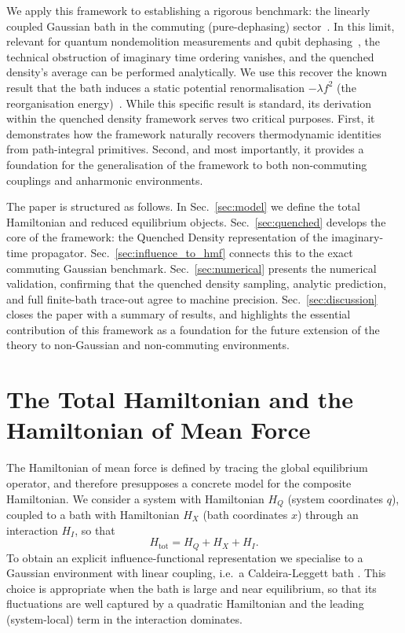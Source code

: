 ﻿\documentclass[aps,prl,twocolumn,superscriptaddress,showpacs,floatfix]{revtex4-2}
\begin{document}
We apply this framework to establishing a rigorous benchmark: the linearly coupled Gaussian bath in the commuting (pure-dephasing) sector~\cite{clerkIntroductionQuantumNoise2010,breuerTheoryOpenQuantum2002}. In this limit, relevant for quantum nondemolition measurements and qubit dephasing~\cite{makhlinQuantumStateEngineering2001,palmaQuantumComputersDissipation1996}, the technical obstruction of imaginary time ordering vanishes, and the quenched density's average can be performed analytically. We use this recover the known result that the bath induces a static potential renormalisation $-\lambda f^2$ (the reorganisation energy)~\cite{campisiTalknerHanggi2009Solvable}. While this specific result is standard, its derivation within the quenched density framework serves two critical purposes. First, it demonstrates how the framework naturally recovers thermodynamic identities from path-integral primitives. Second, and most importantly, it provides a foundation for the generalisation of the framework to both non-commuting couplings and anharmonic environments.

The paper is structured as follows. In Sec.~\ref{sec:model} we define the total Hamiltonian and reduced equilibrium objects. Sec.~\ref{sec:quenched} develops the core of the framework: the Quenched Density representation of the imaginary-time propagator. Sec.~\ref{sec:influence_to_hmf} connects this to the exact commuting Gaussian benchmark. Sec.~\ref{sec:numerical} presents the numerical validation, confirming that the quenched density sampling, analytic prediction, and full finite-bath trace-out agree to machine precision. Sec.~\ref{sec:discussion} closes the paper with a summary of results, and highlights the essential contribution of this framework as a foundation for the future extension of the theory to non-Gaussian and non-commuting environments.
 \section{\label{sec:model}The Total Hamiltonian and the Hamiltonian of Mean Force}
The Hamiltonian of mean force is defined by tracing the global equilibrium
operator, and therefore presupposes a concrete model for the composite
Hamiltonian. We consider a system with Hamiltonian $H_Q$ (system coordinates
$q$), coupled to a bath with Hamiltonian $H_X$ (bath coordinates $x$) through an
interaction $H_I$, so that
\begin{equation}
    H_{\mathrm{tot}}=H_Q+H_X+H_I.
    \label{eq:Htot_model}
\end{equation}
To obtain an explicit influence-functional representation we specialise to a
Gaussian environment with linear coupling, i.e.\ a Caldeira-Leggett bath \cite{caldeiraQuantumTunnellingDissipative1983a}. This
choice is appropriate when the bath is large and near equilibrium, so that its
fluctuations are well captured by a quadratic Hamiltonian and the leading
(system-local) term in the interaction dominates.
\end{document}
